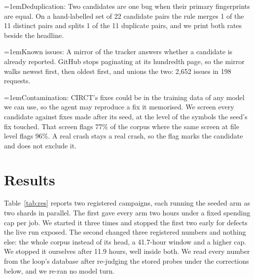 \documentclass[conference]{IEEEtran}
\newcommand{\pointhead}[1]{\par\noindent\hangindent=1em\hangafter=1\makebox[1em][l]{\textbullet}#1:}
\begin{document}
\pointhead{Deduplication} Two candidates are one bug when their primary
fingerprints are equal. On a hand-labelled set of 22 candidate pairs the rule
merges 1 of the 11 distinct pairs and splits 1 of the 11 duplicate pairs, and
we print both rates beside the headline. %

\pointhead{Known issues} A mirror of the tracker answers whether a candidate is
already reported. GitHub stops paginating at its hundredth page, so the mirror
walks newest first, then oldest first, and unions the two: 2,652 issues in 198
requests. %

\pointhead{Contamination} CIRCT's fixes could be in the training data of any model
we can use, so the agent may reproduce a fix it memorised. We screen every
candidate against fixes made after its seed, at the level of the symbols the
seed's fix touched. That screen flags 77\% of the corpus where the same screen
at file level flags 96\%. %
A real crash stays a real crash, so the flag marks the candidate and does not
exclude it.

\section{Results}\label{sec:res}
Table~\ref{tab:res} reports two registered campaigns, each running the seeded
arm as two shards in parallel. The first gave every arm two hours under a fixed
spending cap per job. We started it three times and stopped the first two early
for defects the live run exposed. %
The second changed three registered numbers and nothing else: the whole corpus
instead of its head, a 41.7-hour window and a higher cap. We stopped it
ourselves after 11.9 hours, well inside both. %
We read every number from the loop's database after re-judging the stored
probes under the corrections below, and we re-ran no model turn. %
\end{document}
